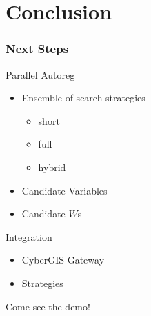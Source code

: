 \documentclass[usepdftitle=false,professionalfonts,compress ]{beamer}
\begin{document}
\section*{Conclusion}

\begin{frame}\frametitle{Next Steps}
\begin{block}{Parallel Autoreg}
\begin{itemize}
	\item Ensemble of search strategies
	\begin{itemize}
		\item short
		\item full
		\item hybrid
	\end{itemize}
	\item Candidate Variables
	\item Candidate $W$s
\end{itemize}
\end{block}
\begin{block}{Integration}
\begin{itemize}
	\item CyberGIS Gateway
	\item Strategies
\end{itemize}
\end{block}
\alert{Come see the demo!}
\end{frame}
%
%
%	
\end{document}
